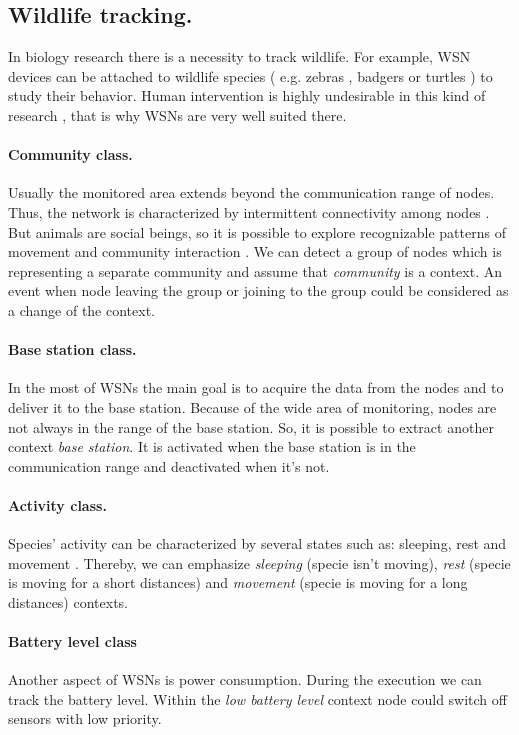 \documentclass[12pt,a4paper]{article}
\begin{document}
\subsection{Wildlife tracking.} In biology research there is a necessity to track wildlife. For example, WSN devices can be attached to wildlife species ( e.g. zebras \cite{juang02}, badgers \cite{dyo09} or turtles \cite{gorlick07}) to study their behavior. Human intervention is highly undesirable in this kind of research \cite{juang02}, that is why WSNs are very well suited there.

\paragraph{Community class.} Usually the monitored area extends beyond the communication range of nodes. Thus, the network is characterized by intermittent connectivity among nodes \cite{lukac06}. But animals are social beings, so it is possible to explore recognizable patterns of movement and community interaction \cite{pastor08}. We can detect a group of nodes which is representing a separate community and assume that \textit{community} is a context. An event when node leaving the group or joining to the group could be considered as a change of the context.

\paragraph{Base station class.} In the most of WSNs the main goal is to acquire the data from the nodes and to deliver it to the base station. Because of the wide area of monitoring, nodes are not always in the range of the base station. So, it is possible to extract another context \textit{base station}. It is activated when the base station is in the communication range and deactivated when it's not.

\paragraph{Activity class.} Species' activity can be characterized by several states such as: sleeping, rest and movement \cite{juang02}. Thereby, we can emphasize \textit{sleeping} (specie isn't moving), \textit{rest} (specie is moving for a short distances) and \textit{movement} (specie is moving for a long distances) contexts.

\paragraph{Battery level class} Another aspect of WSNs is power consumption. During the execution we can track the battery level. Within the  \textit{low battery level} context node could switch off sensors with low priority.
\end{document}
